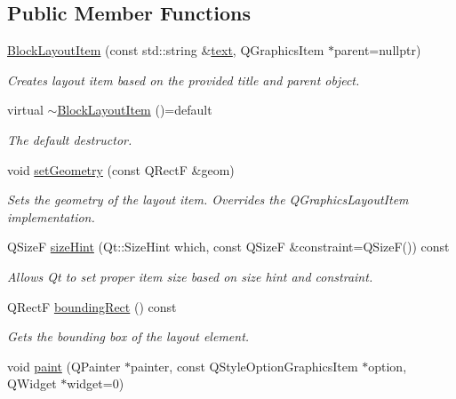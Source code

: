 \subsection*{Public Member Functions}
\begin{DoxyCompactItemize}
\item 
\mbox{\hyperlink{class_block_layout_item_ad5ffcaab7d39d6a3c7e29f990acebc21}{Block\+Layout\+Item}} (const std\+::string \&\mbox{\hyperlink{class_block_layout_item_a374055c252f6532b80b31d065ebf1a11}{text}}, Q\+Graphics\+Item $\ast$parent=nullptr)
\begin{DoxyCompactList}\small\item\em Creates layout item based on the provided title and parent object. \end{DoxyCompactList}\item 
virtual \mbox{\hyperlink{class_block_layout_item_aa39e2ec9aa8fd0168bbc5eca07eb5814}{$\sim$\+Block\+Layout\+Item}} ()=default
\begin{DoxyCompactList}\small\item\em The default destructor. \end{DoxyCompactList}\item 
void \mbox{\hyperlink{class_block_layout_item_a46955c91f71c6fb77d7f01b102e0daec}{set\+Geometry}} (const Q\+RectF \&geom)
\begin{DoxyCompactList}\small\item\em Sets the geometry of the layout item. Overrides the Q\+Graphics\+Layout\+Item implementation. \end{DoxyCompactList}\item 
Q\+SizeF \mbox{\hyperlink{class_block_layout_item_aed00c617a4ca20cc196fe2809382488b}{size\+Hint}} (Qt\+::\+Size\+Hint which, const Q\+SizeF \&constraint=Q\+SizeF()) const
\begin{DoxyCompactList}\small\item\em Allows Qt to set proper item size based on size hint and constraint. \end{DoxyCompactList}\item 
Q\+RectF \mbox{\hyperlink{class_block_layout_item_a6de4f93c0a2cdcccd5fe9f94f1769906}{bounding\+Rect}} () const
\begin{DoxyCompactList}\small\item\em Gets the bounding box of the layout element. \end{DoxyCompactList}\item 
void \mbox{\hyperlink{class_block_layout_item_a418628ab57eed9f9e9857f1a33149c54}{paint}} (Q\+Painter $\ast$painter, const Q\+Style\+Option\+Graphics\+Item $\ast$option, Q\+Widget $\ast$widget=0)

\end{DoxyCompactItemize}
